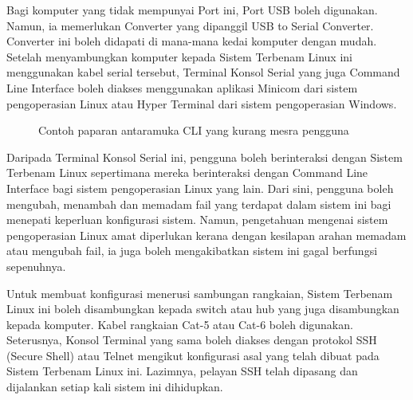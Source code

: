 Bagi komputer yang tidak mempunyai Port ini, Port USB boleh digunakan. Namun, ia memerlukan Converter yang dipanggil USB to Serial Converter. Converter ini boleh didapati di mana-mana kedai komputer dengan mudah. Setelah menyambungkan komputer kepada Sistem Terbenam Linux ini menggunakan kabel serial tersebut, Terminal Konsol Serial yang juga Command Line Interface boleh diakses menggunakan aplikasi Minicom dari sistem pengoperasian Linux atau Hyper Terminal dari sistem pengoperasian Windows.

\begin{figure}[!h]
\caption[Contoh paparan antaramuka CLI]{Contoh paparan antaramuka CLI yang kurang mesra pengguna}
\label{c2:f2}
\end{figure}

Daripada Terminal Konsol Serial ini, pengguna boleh berinteraksi dengan Sistem Terbenam Linux sepertimana mereka berinteraksi dengan Command Line Interface bagi sistem pengoperasian Linux yang lain. Dari sini, pengguna boleh mengubah, menambah dan memadam fail yang terdapat dalam sistem ini bagi menepati keperluan konfigurasi sistem. Namun, pengetahuan mengenai sistem pengoperasian Linux amat diperlukan kerana dengan kesilapan arahan memadam atau mengubah fail, ia juga boleh mengakibatkan sistem ini gagal berfungsi sepenuhnya.

\pagebreak

Untuk membuat konfigurasi menerusi sambungan rangkaian, Sistem Terbenam Linux ini boleh disambungkan kepada switch atau hub yang juga disambungkan kepada komputer. Kabel rangkaian Cat-5 atau Cat-6 boleh digunakan. Seterusnya, Konsol Terminal yang sama boleh diakses dengan protokol SSH (Secure Shell) atau Telnet mengikut konfigurasi asal yang telah dibuat pada Sistem Terbenam Linux ini. Lazimnya, pelayan SSH telah dipasang dan dijalankan setiap kali sistem ini dihidupkan.

